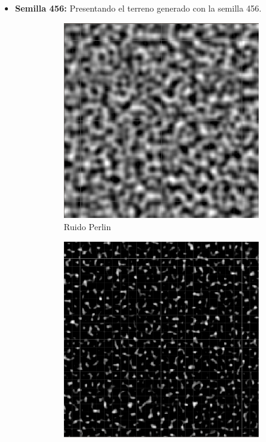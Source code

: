 \begin{itemize}
    \item \textbf{Semilla 456:} Presentando el terreno generado con la semilla 456.
    \begin{figure}[ht]
        \begin{subfigure}{0.3\linewidth}
            \centering
            \includegraphics[width=\linewidth]{img/codes/Perlin456.png}
            \caption{Ruido Perlin}
        \end{subfigure}
        \hfill
        \begin{subfigure}{0.3\linewidth}
            \centering
            \includegraphics[width=\linewidth]{img/codes/Simplex456.png}

\end{subfigure}
\end{figure}
\end{itemize}
